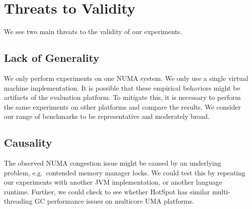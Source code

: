 \section{Threats to Validity}
\label{sec:threats}

We see two main threats to the validity of our experiments.

\subsection{Lack of Generality}
We only perform experiments on one NUMA system. We only use a single 
virtual machine implementation.
It is possible that these empirical behaviors might be artifacts of the
evaluation platform. To mitigate this, it is necessary to perform
the same experiments on other platforms and compare the results.
We consider our range of benchmarks to be representative
and moderately broad.

\subsection{Causality}
The observed NUMA congestion issue might be caused by an underlying
problem, e.g.\ contended memory manager locks.
We could test this by repeating our experiments with another JVM implementation,
or another language runtime.
Further, we could check to see whether HotSpot has similar multi-threading 
GC performance issues on multicore UMA platforms.